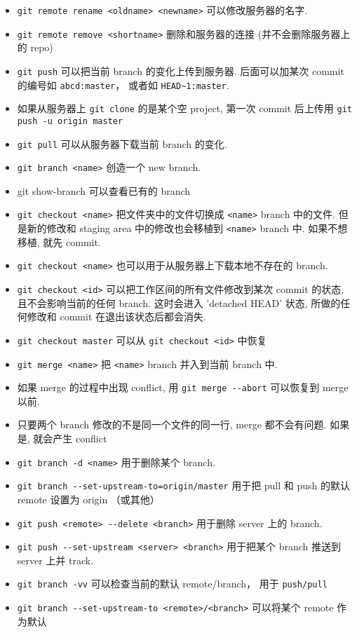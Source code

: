 \begin{itemize}
\item \verb|git remote rename <oldname> <newname>| 可以修改服务器的名字.
\item \verb|git remote remove <shortname>| 删除和服务器的连接 (并不会删除服务器上的 repo)
\item \verb|git push| 可以把当前 branch 的变化上传到服务器. 后面可以加某次 commit 的编号如 \verb|abcd:master|， 或者如 \verb|HEAD~1:master|.
\item 如果从服务器上 \verb|git clone| 的是某个空 project, 第一次 commit 后上传用 \verb|git push -u origin master|
\item \verb|git pull| 可以从服务器下载当前 branch 的变化.
\item \verb|git branch <name>| 创造一个 new branch.
\item git show-branch 可以查看已有的 branch
\item \verb|git checkout <name>| 把文件夹中的文件切换成 \verb|<name>| branch 中的文件. 但是新的修改和 staging area 中的修改也会移植到 \verb|<name>| branch 中. 如果不想移植, 就先 commit.
\item \verb|git checkout <name>| 也可以用于从服务器上下载本地不存在的 branch.
\item \verb|git checkout <id>| 可以把工作区间的所有文件修改到某次 commit 的状态, 且不会影响当前的任何 branch. 这时会进入 'detached HEAD' 状态, 所做的任何修改和 commit 在退出该状态后都会消失.
\item \verb|git checkout master| 可以从 \verb|git checkout <id>| 中恢复
\item \verb|git merge <name>| 把 \verb|<name>| branch 并入到当前 branch 中.
\item 如果 merge 的过程中出现 conflict, 用 \verb|git merge --abort| 可以恢复到 merge 以前.
\item 只要两个 branch 修改的不是同一个文件的同一行, merge 都不会有问题. 如果是, 就会产生 conflict
\item \verb|git branch -d <name>| 用于删除某个 branch.
\item \verb|git branch --set-upstream-to=origin/master| 用于把 pull 和 push 的默认 remote 设置为 origin （或其他）
\item \verb|git push <remote> --delete <branch>| 用于删除 server 上的 branch.
\item \verb|git push --set-upstream <server> <branch>| 用于把某个 branch 推送到 server 上并 track.
\item \verb|git branch -vv| 可以检查当前的默认 remote/branch， 用于 \verb|push/pull|
\item \verb|git branch --set-upstream-to <remote>/<branch>| 可以将某个 remote 作为默认

\end{itemize}
